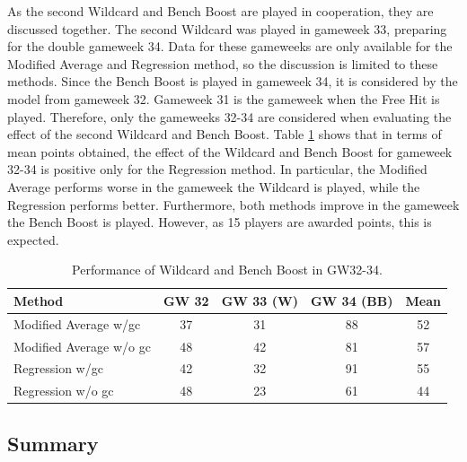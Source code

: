 \newpar

As the second Wildcard and Bench Boost are played in cooperation, they are discussed together. The second Wildcard was played in gameweek 33, preparing for the double gameweek 34. Data for these gameweeks are only available for the Modified Average and Regression method, so the discussion is limited to these methods. Since the Bench Boost is played in gameweek 34, it is considered by the model from gameweek 32. Gameweek 31 is the gameweek when the Free Hit is played. Therefore, only the gameweeks 32-34 are considered when evaluating the effect of the second Wildcard and Bench Boost. Table \ref{tab:performance_wildcard_and_bench_boost} shows that in terms of mean points obtained, the effect of the Wildcard and Bench Boost for gameweek 32-34 is positive only for the Regression method. In particular, the Modified Average performs worse in the gameweek the Wildcard is played, while the Regression performs better. Furthermore, both methods improve in the gameweek the Bench Boost is played. However, as 15 players are awarded points, this is expected.


\begin{table}[H]
\centering
\begin{tabular}{@{}lcccc@{}}
\toprule
Method                  & GW 32 & GW 33 (W) & GW 34 (BB) & Mean \\ \midrule
Modified Average w/gc   & 37    & 31        & 88         & 52   \\
Modified Average w/o gc & 48    & 42        & 81         & 57   \\
Regression w/gc         & 42    & 32        & 91         & 55   \\
Regression w/o gc       & 48    & 23        & 61         & 44   \\ \bottomrule
\end{tabular}
\caption{Performance of Wildcard and Bench Boost in GW32-34.}
\label{tab:performance_wildcard_and_bench_boost}
\end{table}






\subsection{Summary}

